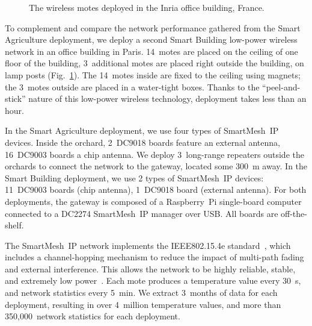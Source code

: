\documentclass{elsarticle}
\newcommand{\smip}                {SmartMesh~IP\xspace}
\newcommand{\building}            {Smart Building\xspace}
\newcommand{\agri}                {Smart Agriculture\xspace}
\begin{document}
\begin{figure}
\begin{minipage}[b]{0.3\textwidth}
        \caption{The wireless motes deployed in the Inria office building, France.}
        \label{fig:evalab_map}
    \end{minipage}
\end{figure}


To complement and compare the network performance gathered from the \agri deployment, we deploy a second \building low-power wireless network in an office building in Paris.
14~motes are placed on the ceiling of one floor of the building, 3~additional motes are placed right outside the building, on lamp posts (Fig.~\ref{fig:evalab_map}).
The 14~motes inside are fixed to the ceiling using magnets; the 3~motes outside are placed in a water-tight boxes.
Thanks to the ``peel-and-stick'' nature of this low-power wireless technology, deployment takes less than an hour.


In the \agri deployment, we use four types of \smip devices.
Inside the orchard, 2~DC9018 boards feature an external antenna, 16~DC9003 boards a chip antenna.
We deploy 3~long-range repeaters outside the orchards to connect the network to the gateway, located some 300~m away.
In the \building deployment, we use 2 types of \smip devices: 11~DC9003 boards (chip antenna), 1~DC9018 board (external antenna).
For both deployments, the gateway is composed of a Raspberry~Pi single-board computer connected to a DC2274 \smip manager over USB.
All boards are off-the-shelf.


The \smip network implements the IEEE802.15.4e standard~\cite{std_ieee802154e_2012}, which includes a channel-hopping mechanism to reduce the impact of multi-path fading and external interference.
This allows the network to be highly reliable, stable, and extremely low power~\cite{watteyne10mitigating,watteyne09reliability}.
Each mote produces a temperature value every 30~s, and network statistics every 5~min.
We extract 3~months of data for each deployment, resulting in over 4~million temperature values, and more than 350,000~network statistics for each deployment.

\end{document}
